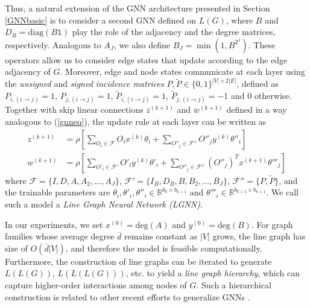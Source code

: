 \documentclass{article} \usepackage{iclr2019_conference,times}
\begin{document}
Thus, a natural extension of the GNN architecture presented in Section \ref{GNNbasic} is to 
consider a second GNN defined on $L(G)$, where $B$ and $D_{B}= \mathrm{diag}(B \mathds{1})$ play the role of the adjacency and the degree matrices, respectively. Analogous to $A_J$, we also define $B_J= \min(1, B^{2^J})$. These operators allow us to consider edge states that update according 
to the edge adjacency of $G$. Moreover, edge and node states communicate at each layer using the \textit{unsigned} and \textit{signed incidence matrices} $P, \tilde{P} \in \{0,1\}^{|V| \times 2|E| }$, defined as 
$P_{i, (i\to j)} = 1$, $P_{j, (i\to j)} = 1$, $\tilde{P}_{i, (i\to j)} = 1$, $\tilde{P}_{j, (i\to j)} = -1$ and $0$ otherwise. Together with skip linear connections $\overline{z}^{(k+1)}$ and $\overline{w}^{(k+1)}$ defined in a way analogous to (\ref{gnneq}), the update rule at each layer can be written as
\begin{equation}
\label{gnneqline}
\begin{aligned}
z^{(k+1)} &= \rho \left[ \sum_{O_i \in \mathcal{F}} O_i x^{(k)} \theta_i + \sum_{O''_j \in \mathcal{F}''} O''_j y^{(k)} \theta''_i \right] \\
w^{(k+1)} &= \rho \left[ \sum_{O'_l \in \mathcal{F}'} O'_l y^{(k)} \theta'_i + \sum_{O''_j \in \mathcal{F}''} (O''_j)^T x^{(k+1)} \theta'''_j \right]
\end{aligned}
\end{equation}
where $\mathcal{F} = \{ I, D, A, A_{2}, \dots, A_{J}\}$, $\mathcal{F}' = \{I_B, D_B, B, B_{2}, \dots, B_{J}\}$, $\mathcal{F}'' = \{P, \tilde{P}\}$, and the trainable parameters are $\theta_i, \theta'_i, \theta''_i \in \mathbb{R}^{b_k \times b_{k+1}}$ and $\theta'''_i \in \mathbb{R}^{b_{k+1} \times b_{k+1}}$. We call such a model a \textit{Line Graph Neural Network (LGNN)}. 




In our experiments, we set $x^{(0)} = \mathrm{deg}(A)$ and $y^{(0)} = \mathrm{deg}(B)$. For graph families whose average degree $\overline{d}$ remains constant as $|V|$ grows, the line graph has size of $O(\overline{d} |V|)$, 
and therefore the model is feasible computationally. Furthermore, the construction of line graphs can be iterated to generate $L(L(G))$, $L(L(L(G)))$, etc. to yield a \emph{line graph hierarchy}, which can capture higher-order interactions among nodes of $G$. Such a hierarchical construction is related to other recent efforts to generalize GNNs \citep{kondor2018covariant, morris2019weisfeiler}. 
\end{document}
